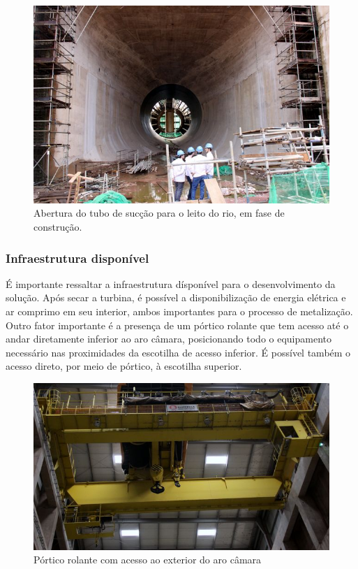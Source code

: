 \begin{figure}[H]	
	\includegraphics[width=\columnwidth]{figs/viagem/2015_04_30/Vao/img_5086}
	\caption{Abertura do tubo de sucção para o leito do rio, em fase de
	construção.}
	\label{fig::tubo_suc}
\end{figure}

\subsubsection{Infraestrutura disponível}
É importante ressaltar a infraestrutura dísponível para o desenvolvimento da solução. 
Após secar a turbina, é possível a disponibilização de energia elétrica e ar
comprimo em seu interior, ambos importantes para o processo de metalização. Outro fator 
importante é a presença de um pórtico rolante que tem acesso até o andar diretamente 
inferior ao aro câmara, posicionando todo o equipamento necessário nas proximidades 
da escotilha de acesso inferior. É possível também o acesso direto, por meio de pórtico, 
à escotilha superior.

\begin{figure}[h!]	
	\includegraphics[width=\columnwidth]{figs/viagem/2015_04_28/UG/img_4989}
	\caption{Pórtico rolante com acesso ao exterior do aro câmara}
	\label{fig::portico}
\end{figure}


